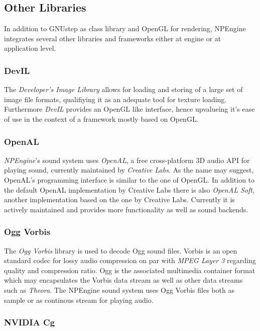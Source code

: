 \subsection{Other Libraries}

In addition to GNUstep as class library and OpenGL for rendering, NPEngine
integrates several other libraries and frameworks either at engine or at
application level.

\subsubsection{DevIL}

The \textit{Developer's Image Library}\cite{misc:devil} allows for loading and
storing of a large set of image file formats, qualifiying it as an adequate
tool for texture loading. Furthermore \textit{DevIL} provides an OpenGL like
interface, hence upvalueing it's ease of use in the context of a framework
mostly based on OpenGL.

\subsubsection{OpenAL}

\textit{NPEngine}'s sound system uses \textit{OpenAL}, a free
cross-platform 3D audio API for playing sound, currently maintained by
\textit{Creative Labs}. As the name may suggest, OpenAL's programming interface
is similar to the one of OpenGL. In addition to the default OpenAL
implementation by Creative Labs there is also \textit{OpenAL Soft}, another
implementation based on the one by Creative Labs. Currently it is actively
maintained and provides more functionality as well as sound backends.

\subsubsection{Ogg Vorbis}

The \textit{Ogg Vorbis} library is used to decode Ogg sound files. Vorbis is an
open standard codec for lossy audio compression on par with \textit{MPEG Layer
3} regarding quality and compression ratio. Ogg is the associated
multimedia container format which may encapsulates the Vorbis data stream as
well as other data streams such as \textit{Theora}. The NPEngine sound system
uses Ogg Vorbis files both as sample or as continous stream for playing audio.

\subsubsection{NVIDIA Cg}

